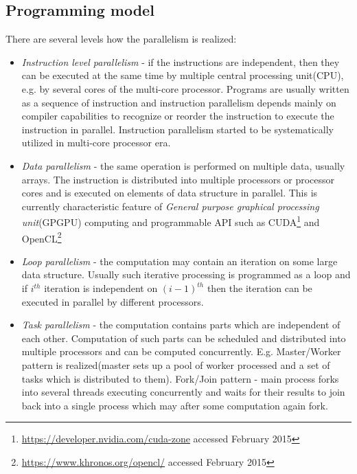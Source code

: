 \subsection{Programming model}
\label{sec:parallelprogramming}
There are several levels how the parallelism is realized:
\begin{itemize}
\item{\emph{Instruction level parallelism} -  if the instructions are independent, then they can be executed at the same time by multiple central processing unit(CPU),  e.g. by several cores of the multi-core processor. Programs are usually written as a sequence of instruction and instruction parallelism depends mainly on compiler capabilities to recognize or reorder the instruction to  execute the instruction in parallel. Instruction parallelism started to be systematically utilized in multi-core processor era.}
\item{\emph{Data parallelism} - the same operation is performed on multiple data, usually arrays. The instruction is distributed into multiple processors or processor cores and is executed on elements of data structure in parallel. This is currently characteristic feature of \emph{General purpose graphical processing unit}(GPGPU) computing and programmable API such as CUDA\footnote{\url{https://developer.nvidia.com/cuda-zone} accessed February 2015} and OpenCL\footnote{\url{https://www.khronos.org/opencl/} accessed February 2015}}
\item{\emph{Loop parallelism} - the computation may contain an iteration on some large data structure. Usually such iterative processing is programmed as a loop and if $i^{th}$ iteration is independent on $(i-1)^{th}$ then the iteration can be executed in parallel by different processors.}
\item{\emph{Task parallelism} - the computation contains parts which are independent of each other. Computation of such parts can be scheduled and distributed into multiple processors and can be computed concurrently. E.g. Master/Worker pattern is realized(master sets up a pool of worker processed and a set of tasks which is distributed to them). Fork/Join pattern - main process forks into several threads executing concurrently and waits for their results to join back into a single process which may after some computation again fork.}
\end{itemize}

